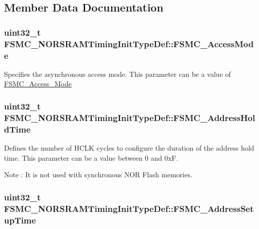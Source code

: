 \subsection{Member Data Documentation}
\hypertarget{structFSMC__NORSRAMTimingInitTypeDef_a261d043a19cecf77e6859403be204efc}{
\subsubsection[{FSMC\_\-AccessMode}]{\setlength{\rightskip}{0pt plus 5cm}uint32\_\-t {\bf FSMC\_\-NORSRAMTimingInitTypeDef::FSMC\_\-AccessMode}}}
\label{structFSMC__NORSRAMTimingInitTypeDef_a261d043a19cecf77e6859403be204efc}
Specifies the asynchronous access mode. This parameter can be a value of \hyperlink{group__FSMC__Access__Mode}{FSMC\_\-Access\_\-Mode} \hypertarget{structFSMC__NORSRAMTimingInitTypeDef_a917b227ccb0a765791897ce3647ab26b}{
\subsubsection[{FSMC\_\-AddressHoldTime}]{\setlength{\rightskip}{0pt plus 5cm}uint32\_\-t {\bf FSMC\_\-NORSRAMTimingInitTypeDef::FSMC\_\-AddressHoldTime}}}
\label{structFSMC__NORSRAMTimingInitTypeDef_a917b227ccb0a765791897ce3647ab26b}
Defines the number of HCLK cycles to configure the duration of the address hold time. This parameter can be a value between 0 and 0xF. \begin{DoxyNote}{Note}
: It is not used with synchronous NOR Flash memories. 
\end{DoxyNote}
\hypertarget{structFSMC__NORSRAMTimingInitTypeDef_a2ba90f4ec16bc38a2c4fa29c593b713b}{
\subsubsection[{FSMC\_\-AddressSetupTime}]{\setlength{\rightskip}{0pt plus 5cm}uint32\_\-t {\bf FSMC\_\-NORSRAMTimingInitTypeDef::FSMC\_\-AddressSetupTime}}}
